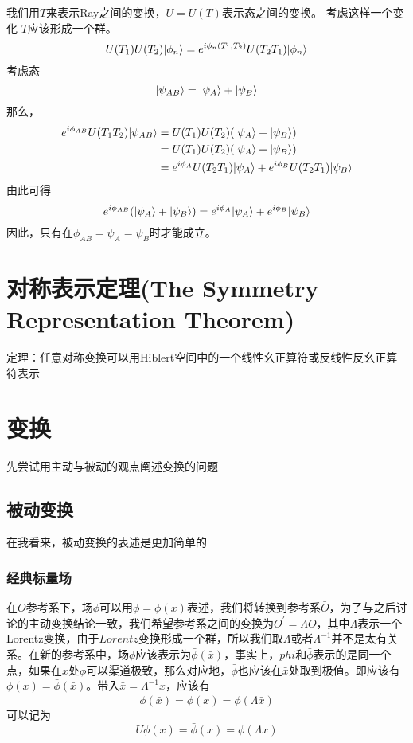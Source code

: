 我们用$T$来表示Ray之间的变换，$U = U(T)$表示态之间的变换。
考虑这样一个变化
$T$应该形成一个群。
\begin{equation}
    U(T_1)U(T_2)|\phi_n\rangle = e^{i\phi_n(T_1, T_2)}U(T_2T_1)|\phi_n\rangle
\end{equation}
考虑态
\begin{equation}
    |\psi_{AB}\rangle = |\psi_A\rangle + |\psi_B\rangle
\end{equation}
那么，
\begin{align}
    e^{i\phi_{AB}}U(T_1T_2)|\psi_{AB}\rangle &= U(T_1)U(T_2)(|\psi_A\rangle + |\psi_B\rangle) \\
&= U(T_1)U(T_2)(|\psi_A\rangle + |\psi_B\rangle) \\
&= e^{i\phi_A}U(T_2T_1)|\psi_A\rangle + e^{i\phi_B}U(T_2T_1)|\psi_B\rangle 
\end{align}
由此可得
\begin{equation}
e^{i\phi_{AB}}(|\psi_A\rangle + |\psi_B\rangle)
= e^{i\phi_A}|\psi_A\rangle + e^{i\phi_B}|\psi_B\rangle
\end{equation}
因此，只有在$\phi_{AB} = \psi_A = \psi_B$时才能成立。



\section{对称表示定理(The Symmetry Representation Theorem)}
定理：任意对称变换可以用Hiblert空间中的一个线性幺正算符或反线性反幺正算符表示

\section{变换}
先尝试用主动与被动的观点阐述变换的问题
\subsection{被动变换}
在我看来，被动变换的表述是更加简单的
\subsubsection{经典标量场}
在$O$参考系下，场$\phi$可以用$\phi = \phi(x)$表述，我们将转换到参考系$\bar{O}$，为了与之后讨论的主动变换结论一致，我们希望参考系之间的变换为$O^\prime = \Lambda O$，其中$\Lambda$表示一个Lorentz变换，由于$Lorentz$变换形成一个群，所以我们取$\Lambda$或者$\Lambda^{-1}$并不是太有关系。在新的参考系中，场$\phi$应该表示为$\bar \phi(\bar x)$，事实上，$phi$和$\bar \phi$表示的是同一个点，如果在$x$处$\phi$可以渠道极致，那么对应地，$\bar \phi$也应该在$\bar x$处取到极值。即应该有$\phi(x) = \bar\phi(\bar x)$。带入$\bar x = \Lambda^{-1} x$，应该有
\begin{equation}
    \bar\phi(\bar x) = \phi(x) = \phi(\Lambda \bar x)
\end{equation}
可以记为
\begin{equation}
    U\phi(x) = \bar\phi(x) = \phi(\Lambda x)
\end{equation}


